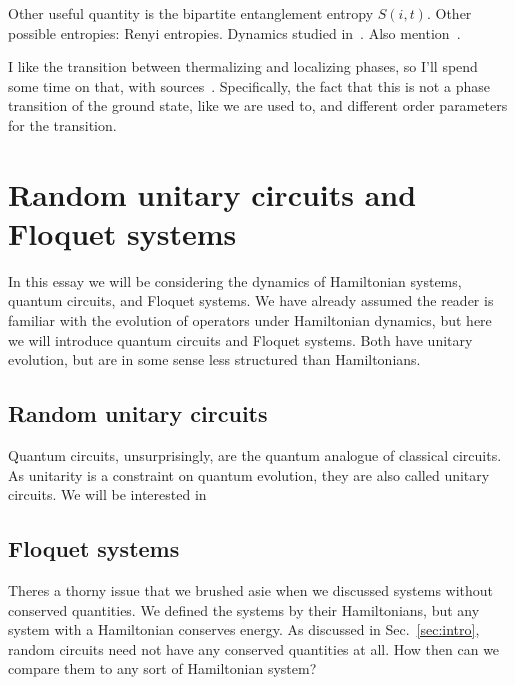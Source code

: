 \documentclass[a4paper,12pt]{article}
\newcommand{\note}[1]{{\color{red}{#1}}}
\begin{document}
Other useful quantity is the bipartite entanglement entropy $S(i,t)$.
Other possible entropies: Renyi entropies.
Dynamics studied in~\cite{RakovskyDiff, HuangRenyi}.
Also mention~\cite{JonayEntanglement}.

I like the transition between thermalizing and localizing phases, so I'll spend some time on that, with sources~\cite{PalHuse, KhemaniCP}. Specifically, the fact that this is not a phase transition of the ground state, like we are used to, and different order parameters for the transition. 


\section{Random unitary circuits and Floquet systems} \label{sec:circuits}

In this essay we will be considering the dynamics of Hamiltonian systems, quantum circuits, and Floquet systems. We have already assumed the reader is familiar with the evolution of operators under Hamiltonian dynamics, but here we will introduce quantum circuits and Floquet systems. Both have unitary evolution, but are in some sense less structured than Hamiltonians.

\note{Define ``physical" systems, disorder realization.}

\note{Haar measure}

\subsection{Random unitary circuits} \label{sub:ruc}

Quantum circuits, unsurprisingly, are the quantum analogue of classical circuits. As unitarity is a constraint on quantum evolution, they are also called unitary circuits. We will be interested in 

\note{Coarse graining}

\subsection{Floquet systems} \label{sub:floq}

Theres a thorny issue that we brushed asie when we discussed systems without conserved quantities. We defined the systems by their Hamiltonians, but any system with a Hamiltonian conserves energy. As discussed in Sec.~\ref{sec:intro}, random circuits need not have any conserved quantities at all. How then can we compare them to any sort of Hamiltonian system?
\end{document}
